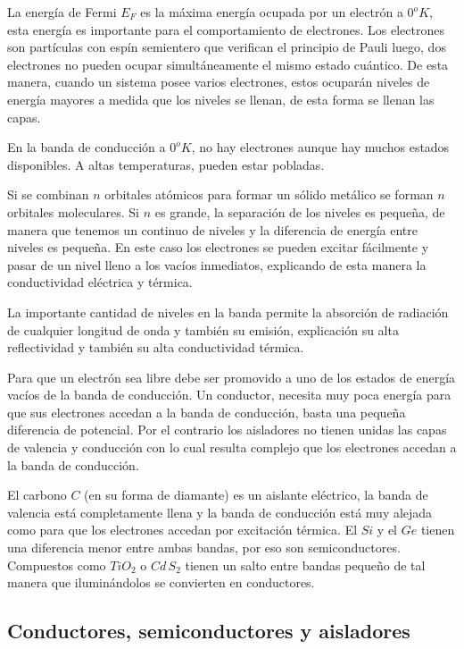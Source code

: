 La energía de Fermi $E_{F}$ es la máxima energía ocupada por un electrón a $0^{o}K$, esta energía es importante para el comportamiento de electrones. Los electrones son partículas con espín semientero que verifican el principio de Pauli luego, dos electrones no pueden ocupar simultáneamente el mismo estado cuántico. De esta manera, cuando un sistema posee varios electrones, estos ocuparán niveles de energía mayores a medida que los niveles se llenan, de esta forma se llenan las capas.

En la banda de conducción a $0^{o}K$, no hay electrones aunque hay muchos estados
disponibles. A altas temperaturas, pueden estar pobladas.

Si se combinan $n$ orbitales atómicos para formar un sólido metálico se forman $n$ orbitales moleculares. Si $n$ es grande, la separación de los niveles es pequeña, de manera que tenemos un continuo de niveles y la diferencia de energía entre niveles es pequeña. En este caso los electrones se pueden excitar fácilmente y pasar de un nivel lleno a los vacíos inmediatos, explicando de esta manera la conductividad eléctrica y
térmica.

La importante cantidad de niveles en la banda permite la absorción de radiación de cualquier longitud de onda y también su emisión, explicación su alta reflectividad y también su alta conductividad térmica.

Para que un electrón sea libre debe ser promovido a uno de los estados de energía vacíos de la banda de conducción. Un conductor, necesita muy poca energía para que sus electrones accedan a la banda de conducción, basta una pequeña diferencia de potencial. Por el contrario los aisladores no tienen unidas las capas de valencia y conducción con lo cual resulta complejo que los electrones accedan a la banda de
conducción.

El carbono $C$ (en su forma de diamante) es un aislante eléctrico, la banda de valencia está completamente llena y la banda de conducción está muy alejada como para que los electrones accedan por excitación térmica. El $Si$ y el $Ge$ tienen una diferencia menor entre ambas bandas, por eso son semiconductores. Compuestos como $TiO_{2}$ o $Cd\,S_{2}$ tienen un salto entre bandas pequeño de tal manera que iluminándolos se convierten en conductores.

\subsection{Conductores, semiconductores y aisladores}

